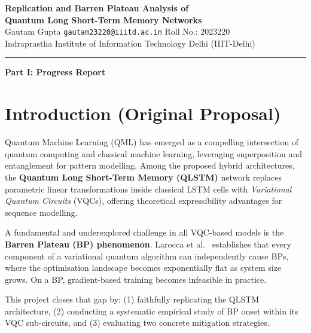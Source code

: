\documentclass[11pt,a4paper]{article}
\begin{document}
\begin{center}
  {\LARGE\bfseries\color{accentblue}
    Replication and Barren Plateau Analysis of\\[4pt]
    Quantum Long Short-Term Memory Networks}\\[10pt]
  {\large Gautam Gupta \quad \texttt{gautam23220@iiitd.ac.in} \quad Roll No.: 2023220}\\[4pt]
  {\normalsize Indraprastha Institute of Information Technology Delhi (IIIT-Delhi)}
\end{center}

\vspace{4pt}
\noindent\rule{\linewidth}{1pt}


\begin{center}
{\large\bfseries\color{accentblue} Part I: Progress Report}
\end{center}

\section{Introduction (Original Proposal)}

Quantum Machine Learning (QML) has emerged as a compelling intersection of quantum computing and classical machine learning, leveraging superposition and entanglement for pattern modelling. Among the proposed hybrid architectures, the \textbf{Quantum Long Short-Term Memory (QLSTM)} network \cite{chen2020} replaces parametric linear transformations inside classical LSTM cells with \textit{Variational Quantum Circuits} (VQCs), offering theoretical expressibility advantages for sequence modelling.

A fundamental and underexplored challenge in all VQC-based models is the \textbf{Barren Plateau (BP) phenomenon}. Larocca et al.\ \cite{larocca2024} establishes that every component of a variational quantum algorithm can independently cause BPs, where the optimisation landscape becomes exponentially flat as system size grows. On a BP, gradient-based training becomes infeasible in practice.

This project closes that gap by: (1) faithfully replicating the QLSTM architecture, (2) conducting a systematic empirical study of BP onset within its VQC sub-circuits, and (3) evaluating two concrete mitigation strategies.
\end{document}
